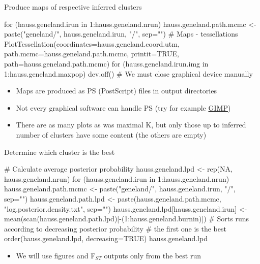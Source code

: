 \documentclass[compress, ucs, xelatex, 11pt, xcolor=svgnames,
  hyperref={
    bookmarks=true,
    unicode=true,
    colorlinks=true,
    pdftitle={Molecular data in R},
    plainpages=false,
    pdfauthor={Vojtech Zeisek},
    pdfsubject={Course about phylogeny and evolution in R},
    pdfcreator={XeLaTeX},
    pdfkeywords={R, evolution, phylogeny, molecular data},
    linkcolor=Tomato,
    anchorcolor=SaddleBrown,
    citecolor=Goldenrod,
    filecolor=DarkMagenta,
    menucolor=Sienna,
    urlcolor=DarkTurquoise,
    pdftex},
  url={hyphens, lowtilde} %
  ]{beamer}
\begin{document}
\begin{frame}[fragile]{Produce maps of respective inferred clusters}
  \begin{spluscode}
    for (hauss.geneland.irun in 1:hauss.geneland.nrun) {
      hauss.geneland.path.mcmc <- paste("geneland/",
        hauss.geneland.irun, "/", sep="")
      # Maps - tessellations
      PlotTessellation(coordinates=hauss.geneland.coord.utm,
        path.mcmc=hauss.geneland.path.mcmc, printit=TRUE,
        path=hauss.geneland.path.mcmc)
      for (hauss.geneland.irun.img in 1:hauss.geneland.maxpop) {
        dev.off() } # We must close graphical device manually
      }
  \end{spluscode}
  \begin{itemize}
    \item Maps are produced as PS (PostScript) files in output directories
    \item Not every graphical software can handle PS (try for example \href{https://www.gimp.org/}{GIMP})
    \item There are as many plots as was maximal K, but only those up to inferred number of clusters have some content (the others are empty)
  \end{itemize}
\end{frame}

\begin{frame}[fragile]{Determine which cluster is the best}
  \begin{spluscode}
    # Calculate average posterior probability
    hauss.geneland.lpd <- rep(NA, hauss.geneland.nrun)
    for (hauss.geneland.irun in 1:hauss.geneland.nrun) {
      hauss.geneland.path.mcmc <- paste("geneland/",
        hauss.geneland.irun, "/", sep="")
      hauss.geneland.path.lpd <- paste(hauss.geneland.path.mcmc,
        "log.posterior.density.txt", sep="")
      hauss.geneland.lpd[hauss.geneland.irun] <- 
        mean(scan(hauss.geneland.path.lpd)[-(1:hauss.geneland.burnin)])
      }
    # Sorts runs according to decreasing posterior probability
    # the first one is the best
    order(hauss.geneland.lpd, decreasing=TRUE)
    hauss.geneland.lpd
  \end{spluscode}
  \begin{itemize}
    \item We will use figures and F$_{ST}$ outputs only from the best run
  \end{itemize}
\end{frame}
\end{document}
